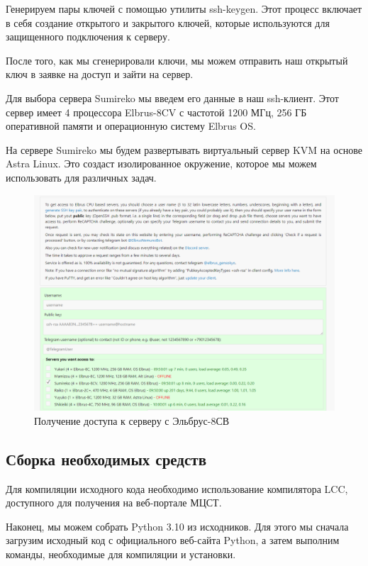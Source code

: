 Генерируем пары ключей с помощью утилиты ssh-keygen. Этот процесс включает в себя создание открытого и закрытого ключей, которые используются для защищенного подключения к серверу. 
\begin{listing}[H]
\end{listing}
\label{lst:c}
После того, как мы сгенерировали ключи, мы можем отправить наш открытый ключ в заявке на доступ и зайти на сервер.

Для выбора сервера Sumireko мы введем его данные в наш ssh-клиент. Этот сервер имеет 4 процессора Elbrus-8CV с частотой 1200 МГц, 256 ГБ оперативной памяти и операционную систему Elbrus OS.

На сервере Sumireko мы будем развертывать виртуальный сервер KVM на основе Astra Linux. Это создаст изолированное окружение, которое мы можем использовать для различных задач.

\begin{figure}
  \centering
  \includegraphics[width=.9\textwidth]{graphics/img/elbrus_dostyp.png}
  \caption{Получение доступа к серверу с Эльбрус-8СВ}
  \label{fig:elbrus-dostup}
\end{figure}


\subsection{Сборка необходимых средств}

Для компиляции исходного кода необходимо использование компилятора LCC, доступного для получения на веб-портале МЦСТ.

Наконец, мы можем собрать Python 3.10 из исходников. Для этого мы сначала загрузим исходный код с официального веб-сайта Python, а затем выполним команды, необходимые для компиляции и установки.

